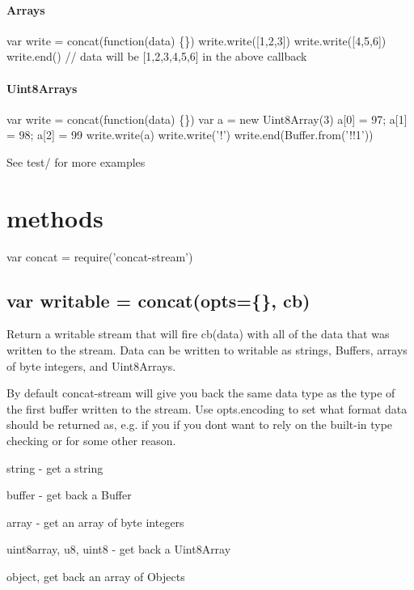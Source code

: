 \paragraph*{Arrays}


\begin{DoxyCode}
var write = concat(function(data) \{\})
write.write([1,2,3])
write.write([4,5,6])
write.end()
// data will be [1,2,3,4,5,6] in the above callback
\end{DoxyCode}


\paragraph*{Uint8\+Arrays}


\begin{DoxyCode}
var write = concat(function(data) \{\})
var a = new Uint8Array(3)
a[0] = 97; a[1] = 98; a[2] = 99
write.write(a)
write.write('!')
write.end(Buffer.from('!!1'))
\end{DoxyCode}


See {\ttfamily test/} for more examples

\section*{methods}


\begin{DoxyCode}
var concat = require('concat-stream')
\end{DoxyCode}


\subsection*{var writable = concat(opts=\{\}, cb)}

Return a {\ttfamily writable} stream that will fire {\ttfamily cb(data)} with all of the data that was written to the stream. Data can be written to {\ttfamily writable} as strings, Buffers, arrays of byte integers, and Uint8\+Arrays.

By default {\ttfamily concat-\/stream} will give you back the same data type as the type of the first buffer written to the stream. Use {\ttfamily opts.\+encoding} to set what format {\ttfamily data} should be returned as, e.\+g. if you if you don\textquotesingle{}t want to rely on the built-\/in type checking or for some other reason.


\begin{DoxyItemize}
\item {\ttfamily string} -\/ get a string
\item {\ttfamily buffer} -\/ get back a Buffer
\item {\ttfamily array} -\/ get an array of byte integers
\item {\ttfamily uint8array}, {\ttfamily u8}, {\ttfamily uint8} -\/ get back a Uint8\+Array
\item {\ttfamily object}, get back an array of Objects
\end{DoxyItemize}


